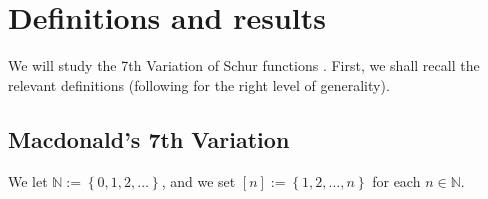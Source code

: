 \documentclass[numbers=enddot,12pt,final,onecolumn,notitlepage]{scrartcl}%
\numberwithin{exer}{section}
\theoremstyle{definition}
\theoremstyle{plainsl}
\begin{document}
\section{Definitions and results}

We will study the 7th Variation of Schur functions \cite[7th Variation]%
{Macdon92}. First, we shall recall the relevant definitions (following
\cite[errata]{Macdon92} for the right level of generality).

\subsection{Macdonald's 7th Variation}

We let $\mathbb{N}:=\left\{  0,1,2,\ldots\right\}  $, and we set $\left[
n\right]  :=\left\{  1,2,\ldots,n\right\}  $ for each $n\in\mathbb{N}$.
\end{document}
